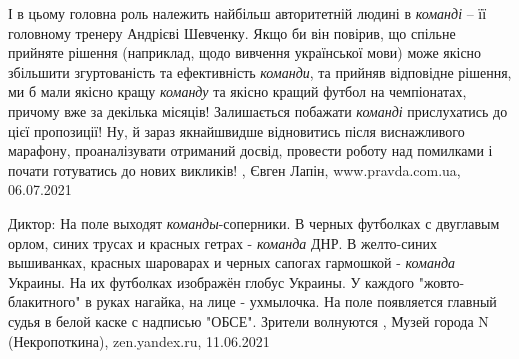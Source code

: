 І в цьому головна роль належить найбільш авторитетній людині в \emph{команді} –
її головному тренеру Андрієві Шевченку. Якщо би він повірив, що спільне
прийняте рішення (наприклад, щодо вивчення української мови) може якісно
збільшити згуртованість та ефективність \emph{команди}, та прийняв відповідне
рішення, ми б мали якісно кращу \emph{команду} та якісно кращий футбол на
чемпіонатах, причому вже за декілька місяців!  Залишається побажати
\emph{команді} прислухатись до цієї пропозиції! Ну, й зараз якнайшвидше
відновитись після виснажливого марафону, проаналізувати отриманий досвід,
провести роботу над помилками і почати готуватись до нових викликів!
, 
Євген Лапін, www.pravda.com.ua, 06.07.2021

Диктор: На поле выходят \emph{команды}-соперники.  В черных футболках с
двуглавым орлом, синих трусах и красных гетрах - \emph{команда} ДНР.  В
желто-синих вышиванках, красных шароварах и черных сапогах гармошкой -
\emph{команда} Украины. На их футболках изображён глобус Украины. У каждого
"жовто-блакитного" в руках нагайка, на лице - ухмылочка.  На поле появляется
главный судья в белой каске с надписью "ОБСЕ".  Зрители волнуются
,
Музей города N (Некропоткина), zen.yandex.ru, 11.06.2021

